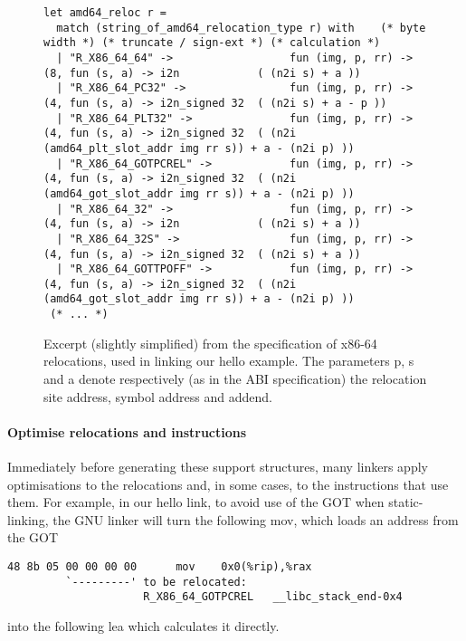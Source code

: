 \documentclass[preprint,10pt]{sigplanconf-pldi16}
\begin{document}
\begin{figure*}
\begin{lstlisting}[language=plain,basicstyle=\scriptsize\sffamily,columns=flexible]
let amd64_reloc r = 
  match (string_of_amd64_relocation_type r) with    (* byte width *) (* truncate / sign-ext *) (* calculation *)
  | "R_X86_64_64" ->                  fun (img, p, rr) -> (8, fun (s, a) -> i2n            ( (n2i s) + a ))
  | "R_X86_64_PC32" ->                fun (img, p, rr) -> (4, fun (s, a) -> i2n_signed 32  ( (n2i s) + a - p ))
  | "R_X86_64_PLT32" ->               fun (img, p, rr) -> (4, fun (s, a) -> i2n_signed 32  ( (n2i (amd64_plt_slot_addr img rr s)) + a - (n2i p) ))
  | "R_X86_64_GOTPCREL" ->            fun (img, p, rr) -> (4, fun (s, a) -> i2n_signed 32  ( (n2i (amd64_got_slot_addr img rr s)) + a - (n2i p) ))
  | "R_X86_64_32" ->                  fun (img, p, rr) -> (4, fun (s, a) -> i2n            ( (n2i s) + a ))
  | "R_X86_64_32S" ->                 fun (img, p, rr) -> (4, fun (s, a) -> i2n_signed 32  ( (n2i s) + a ))
  | "R_X86_64_GOTTPOFF" ->            fun (img, p, rr) -> (4, fun (s, a) -> i2n_signed 32  ( (n2i (amd64_got_slot_addr img rr s)) + a - (n2i p) ))
 (* ... *)
\end{lstlisting}
\caption{Excerpt (slightly simplified) from the specification of x86-64 relocations, used in linking our \textsf{hello} example. 
The parameters \textsf{p}, \textsf{s} and \textsf{a} denote respectively 
(as in the ABI specification) the relocation site address, symbol address and addend.}
\label{fig:command-line}
\end{figure*}

\paragraph{Optimise relocations and instructions} 
Immediately before generating these support structures, 
many linkers apply optimisations to the relocations and, in some cases,
to the instructions that use them.
For example, in our \textsf{hello} link, 
to avoid use of the GOT when static-linking, the GNU linker will turn 
the following \textsf{mov}, which loads an address from the GOT

\begin{lstlisting}[basicstyle=\footnotesize\ttfamily,columns=fixed,language=plain]
48 8b 05 00 00 00 00      mov    0x0(%rip),%rax
         `---------' to be relocated: 
                     R_X86_64_GOTPCREL   __libc_stack_end-0x4
\end{lstlisting}
\noindent
\noindent into the following \textsf{lea} which calculates it directly.
\end{document}
